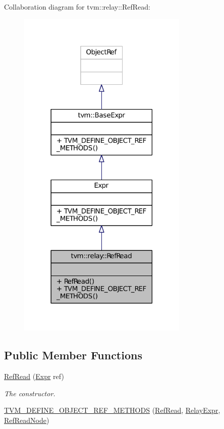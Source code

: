 Collaboration diagram for tvm\+:\+:relay\+:\+:Ref\+Read\+:
\nopagebreak
\begin{figure}[H]
\begin{center}
\leavevmode
\includegraphics[width=230pt]{classtvm_1_1relay_1_1RefRead__coll__graph}
\end{center}
\end{figure}
\subsection*{Public Member Functions}
\begin{DoxyCompactItemize}
\item 
\hyperlink{classtvm_1_1relay_1_1RefRead_a7501ab4e4812195748f41794ccc44659}{Ref\+Read} (\hyperlink{namespacetvm_1_1relay_a5b84e3790f89bb3fad5c7911eeb99531}{Expr} ref)
\begin{DoxyCompactList}\small\item\em The constructor. \end{DoxyCompactList}\item 
\hyperlink{classtvm_1_1relay_1_1RefRead_a35c745158c04e55a15f372f1a372b55c}{T\+V\+M\+\_\+\+D\+E\+F\+I\+N\+E\+\_\+\+O\+B\+J\+E\+C\+T\+\_\+\+R\+E\+F\+\_\+\+M\+E\+T\+H\+O\+DS} (\hyperlink{classtvm_1_1relay_1_1RefRead}{Ref\+Read}, \hyperlink{classtvm_1_1RelayExpr}{Relay\+Expr}, \hyperlink{classtvm_1_1relay_1_1RefReadNode}{Ref\+Read\+Node})
\end{DoxyCompactItemize}


